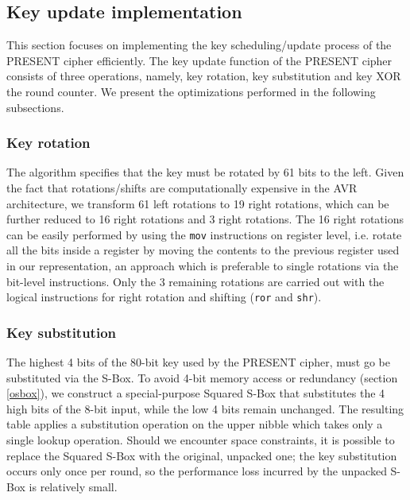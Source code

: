 \documentclass[11pt]{article}
\begin{document}
\subsection{Key update implementation}
This section focuses on implementing the key scheduling/update process of the PRESENT cipher efficiently. The key update function of the PRESENT cipher consists of three operations, namely, key rotation, key substitution and key XOR the round counter. We present the optimizations performed in the following subsections.
\subsubsection{Key rotation}
The algorithm specifies that the key must be rotated by 61 bits to the left. Given the fact that rotations/shifts are computationally expensive in the AVR architecture, we transform 61 left rotations to 19 right rotations, which can be further reduced to 16 right rotations and 3 right rotations. The 16 right rotations can be easily performed by using the \texttt{mov} instructions on register level, i.e. rotate all the bits inside a register by moving the contents to the previous register used in our representation, an approach which is preferable to single rotations via the bit-level instructions. Only the 3 remaining rotations are carried out with the logical instructions for right rotation and shifting (\texttt{ror} and \texttt{shr}).
\subsubsection{Key substitution}
The highest 4 bits of the 80-bit key used by the PRESENT cipher, must go be substituted via the S-Box. To avoid 4-bit memory access or redundancy (section \ref{osbox}), we construct a special-purpose Squared S-Box that substitutes the 4 high bits of the 8-bit input, while the low 4 bits remain unchanged. The resulting table applies a substitution operation on the upper nibble which takes only a single lookup operation. Should we encounter space constraints, it is possible to replace the Squared S-Box with the original, unpacked one; the key substitution occurs only once per round, so the performance loss incurred by the unpacked S-Box is relatively small. 

\end{document}
